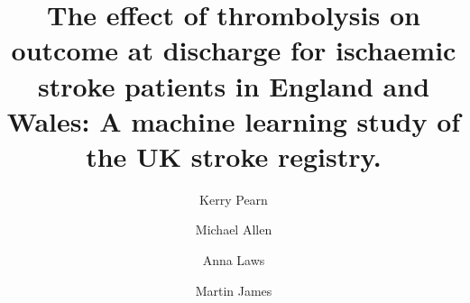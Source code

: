 \title{The effect of thrombolysis on outcome at discharge for ischaemic stroke patients in England and Wales: A machine learning study of the UK stroke registry.}


\renewcommand{\thefootnote}{\fnsymbol{footnote}}
\author[1,2]{Kerry Pearn}
\author[*1,2]{Michael Allen}
\author[1,2]{Anna Laws}
\author[1,2]{Martin James}

